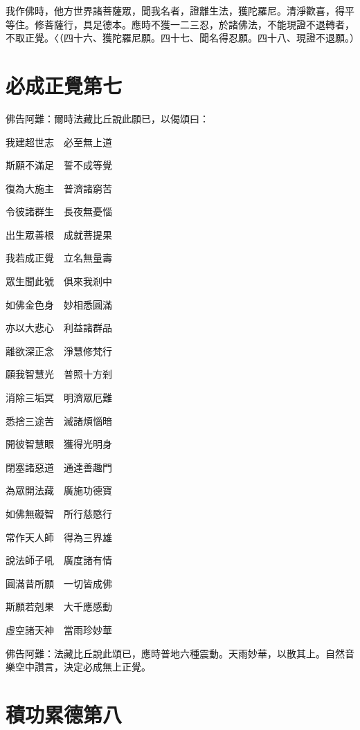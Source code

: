 \documentclass{zhvt-classic}
\begin{document}
我作佛時，他方世界諸菩薩眾，聞我名者，證離生法，獲陀羅尼。清淨歡喜，得平等住。修菩薩行，具足德本。應時不獲一二三忍，於諸佛法，不能現證不退轉者，不取正覺。〈（四十六、獲陀羅尼願。四十七、聞名得忍願。四十八、現證不退願。）

\chapter*{必成正覺第七}

佛告阿難：爾時法藏比丘說此願已，以偈頌曰：

我建超世志　必至無上道

斯願不滿足　誓不成等覺

復為大施主　普濟諸窮苦

令彼諸群生　長夜無憂惱

出生眾善根　成就菩提果

我若成正覺　立名無量壽

眾生聞此號　俱來我剎中

如佛金色身　妙相悉圓滿

亦以大悲心　利益諸群品

離欲深正念　淨慧修梵行

願我智慧光　普照十方剎

消除三垢冥　明濟眾厄難

悉捨三途苦　滅諸煩惱暗

開彼智慧眼　獲得光明身

閉塞諸惡道　通達善趣門

為眾開法藏　廣施功德寶

如佛無礙智　所行慈愍行

常作天人師　得為三界雄

說法師子吼　廣度諸有情

圓滿昔所願　一切皆成佛

斯願若剋果　大千應感動

虛空諸天神　當雨珍妙華

佛告阿難：法藏比丘說此頌已，應時普地六種震動。天雨妙華，以散其上。自然音樂空中讚言，決定必成無上正覺。

\chapter*{積功累德第八}
\end{document}
